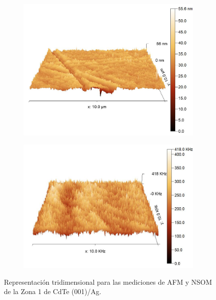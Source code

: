 \begin{figure}[H]
    \centering
    \begin{subfigure}[b]{0.45\textwidth}
        \centering
        \includegraphics[width = 1\textwidth]{figures/chap4/cdte-ag/afm-nsom-results/10um/CdTe_Ag_10um_afm_3d.jpg}
    \end{subfigure}\hfill
    \begin{subfigure}[b]{0.45\textwidth}
        \centering
        \includegraphics[width = 1\textwidth]{figures/chap4/cdte-ag/afm-nsom-results/10um/CdTe_Ag_10um_nsom_3d.jpg}
    \end{subfigure}
\caption{Representación tridimensional para las mediciones de AFM y NSOM de la Zona 1 de CdTe (001)/Ag.}
\label{fig:afm-nsom-results-10um-3d}
\end{figure}

